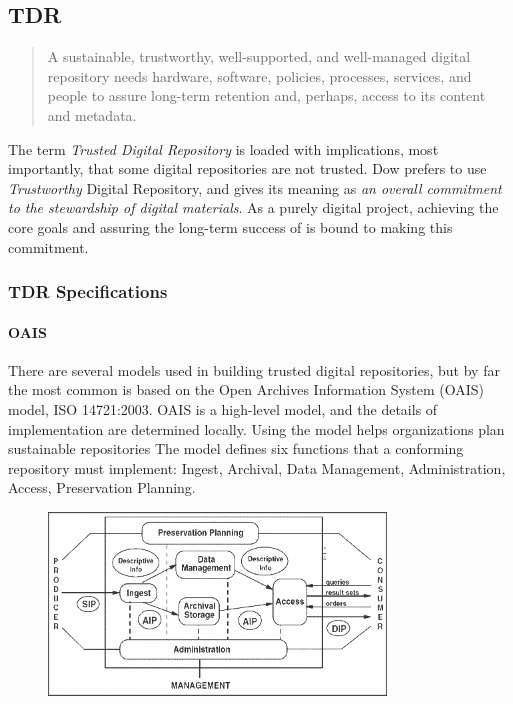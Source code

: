 \subsection{TDR}
\begin{quote}A sustainable, trustworthy, well-supported, and well-managed digital repository needs hardware, software, policies, processes, services, and people to assure long-term retention and, perhaps, access to its content and metadata.\cite{dow_elizabeth_2009} \end{quote}
The term \emph{Trusted Digital Repository} is loaded with implications, most importantly, that some digital repositories are not trusted. Dow prefers to use \emph{Trustworthy} Digital Repository, and gives its meaning as \emph{an overall commitment to the stewardship of digital materials}\cite{dow_elizabeth_2009}. As a purely digital project, achieving the core goals and assuring the long-term success of \projectname{} is bound to making this commitment. 

\subsubsection{TDR Specifications}
\paragraph{OAIS}
There are several models used in building trusted digital repositories, but by far the most common is based on the Open Archives Information System (OAIS) model, ISO 14721:2003. OAIS is a high-level model, and the details of implementation are determined locally. Using the model helps organizations plan sustainable repositories\cite{harvey} The model defines six functions that a conforming repository must implement: Ingest, Archival, Data Management, Administration, Access, Preservation Planning.
\begin{figure}
  \centering
  \includegraphics[width=0.8\textwidth]{OAIS.png}\cite{oais_image}
\end{figure}
